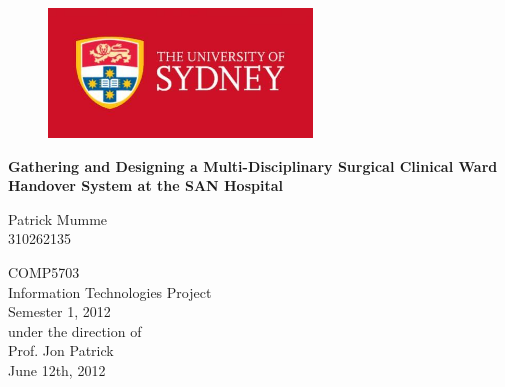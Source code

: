 \begin{titlepage}

\pagestyle{empty}


    	\begin{figure}[hp]
				\centering
				\includegraphics[scale=1.0, width=70mm]{Images/usyd_logo}
	\end{figure} 
			
\bigskip

\begin{center}
    \Huge\bfseries
   Gathering and Designing a Multi-Disciplinary Surgical  Clinical Ward Handover System at the SAN Hospital
\end{center}
\begin{center}
    \Large
    Patrick Mumme \\
   310262135
\end{center}
\bigskip

\begin{center}
\Large
COMP5703 \\
Information Technologies Project \\
Semester 1, 2012\\
\bigskip\bigskip\bigskip
under the direction of\\
Prof. Jon Patrick \\
June 12th, 2012
\end{center}


\bigskip


\vspace*{\fill}

\cleardoublepage

\rmfamily
\normalfont

\end{titlepage}